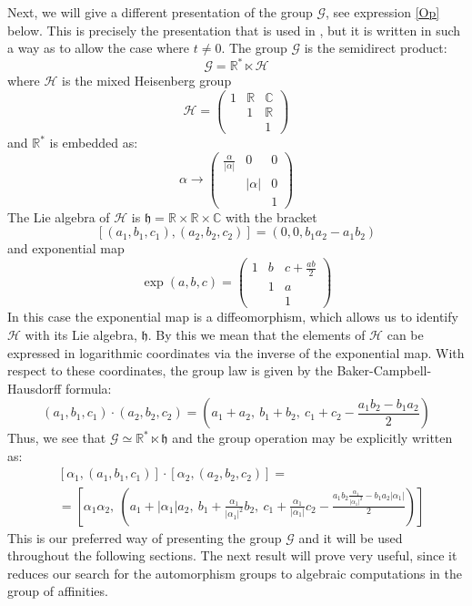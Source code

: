\documentclass[12pt]{amsart}
\begin{document}
\noindent
Next, we will give a different presentation of the group $\mathcal{G}$, see expression \ref{Op} below. This is precisely the presentation that is used in \cite{OeMi}, but it is written in such a way as to allow the case where $t\neq 0$. The group $\mathcal{G}$ is the semidirect product:
\[
\mathcal{G} =   \mathbb{R}^* \ltimes \mathcal{H}
\]
where $\mathcal{H}$ is the mixed Heisenberg group
  \[
  \mathcal{H} = 
  \begin{pmatrix}
  1 & \mathbb{R} & \mathbb{C} \\
    & 1          & \mathbb{R} \\
    &            & 1
  \end{pmatrix}
  \]
and $\mathbb{R}^*$ is embedded as:
  \[
  \alpha \to 
  \begin{pmatrix}
  \frac{\alpha}{|\alpha|} & 0 & 0 \\
                          & |\alpha| & 0 \\
                          &          & 1
  \end{pmatrix}
  \]
The Lie algebra of $\mathcal{H}$ is $\mathfrak{h} = \mathbb{R} \times \mathbb{R} \times \mathbb{C}$ with the bracket
$$
[(a_1, b_1, c_1), (a_2, b_2, c_2)] = (0, 0, b_1 a_2 - a_1 b_2)
$$
and exponential map
$$
\exp(a, b, c) = 
\begin{pmatrix}
1 & b & c + \frac{ab}{2} \\
  & 1 & a \\
  &   & 1
\end{pmatrix}
$$
In this case the exponential map is a diffeomorphism, which allows us to identify $\mathcal{H}$ with its Lie algebra, $\mathfrak{h}$. By this we mean that the elements of $\mathcal{H}$ can be expressed in logarithmic coordinates via the inverse of the exponential map. With respect to these coordinates, the group law is given by the Baker-Campbell-Hausdorff formula:
$$
(a_1, b_1, c_1) \cdot (a_2, b_2, c_2) = \left(a_1 + a_2,\ b_1 + b_2,\ c_1 + c_2 - \frac{a_1 b_2 - b_1 a_2}{2}\right)
$$
Thus, we see that $\mathcal{G} \simeq \mathbb{R}^* \ltimes \mathfrak{h}$ and the group operation may be explicitly written as:
\begin{equation} \label{Op}
\begin{split}
&[\alpha_1, (a_1, b_1, c_1)] \cdot [\alpha_2, (a_2, b_2, c_2)]= \\
& = \left[\alpha_1 \alpha_2,\ \left(a_1 + |\alpha_1| a_2,\ b_1 + \frac{\alpha_1}{|\alpha_1|^2} b_2,\ c_1 + \frac{\alpha_1}{|\alpha_1|} c_2 - \frac{a_1 b_2 \frac{\alpha_1}{|\alpha_1|^2} - b_1 a_2 |\alpha_1|}{2} \right)\right]
\end{split}
\end{equation}
This is our preferred way of presenting the group $\mathcal{G}$ and it will be used throughout the following sections. The next result will prove very useful, since it reduces our search for the automorphism groups to algebraic computations in the group of affinities.\par
\end{document}
